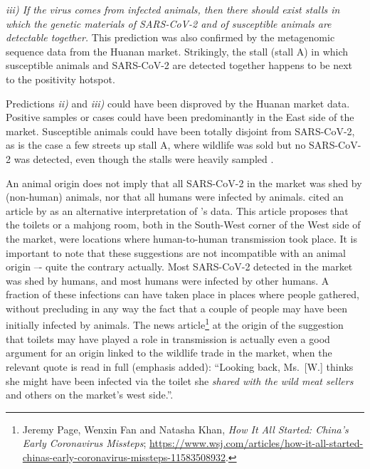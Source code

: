 \documentclass[11pt]{article}
\def \sct {\mbox{SARS-CoV-2}}
\begin{document}
\textit{iii) If the virus comes from infected animals, then there should exist stalls in which the genetic materials of SARS-CoV-2 and of susceptible animals are detectable together.} 
This prediction was also confirmed by the metagenomic sequence data from the Huanan market. Strikingly, the stall (stall A) in which susceptible animals and \sct{} are detected together happens to be next to the positivity hotspot. 

Predictions \textit{ii)} and \textit{iii)} could have been disproved by the Huanan market data. Positive samples or cases could have been predominantly in the East side of the market. Susceptible animals could have been totally disjoint from \sct{}, as is the case a few streets up stall A, where wildlife was sold but no \sct{} was detected, even though the stalls were heavily sampled \citep{Liu2023Nature, ACC2023bioRxiv}.

An animal origin does not imply that all \sct{} in the market was shed by (non-human) animals, nor that all humans were infected by animals.  cited an article by \citet{CORibera2022ER} as an alternative interpretation of \citet{Liu2022RS}'s data. This article proposes that the toilets or a mahjong room, both in the South-West corner of the West side of the market, were locations where human-to-human transmission took place. It is important to note that these suggestions are not incompatible with an animal origin –- quite the contrary actually. Most \sct{} detected in the market was shed by humans, and most humans were infected by other humans. A fraction of these infections can have taken place in places where people gathered, without precluding in any way the fact that a couple of people may have been initially infected by animals. The news article\footnote{ 
Jeremy Page, Wenxin Fan and Natasha Khan, \textit{How It All Started: China's Early Coronavirus Missteps}; \url{https://www.wsj.com/articles/how-it-all-started-chinas-early-coronavirus-missteps-11583508932}.} at the origin of the suggestion that toilets may have played a role in transmission is actually even a good argument for an origin linked to the wildlife trade in the market, when the relevant quote is read in full (emphasis added): ``Looking back, Ms.\ [W.] thinks she might have been infected via the toilet she \textit{shared with the wild meat sellers} and others on the market's west side.''.
\end{document}

